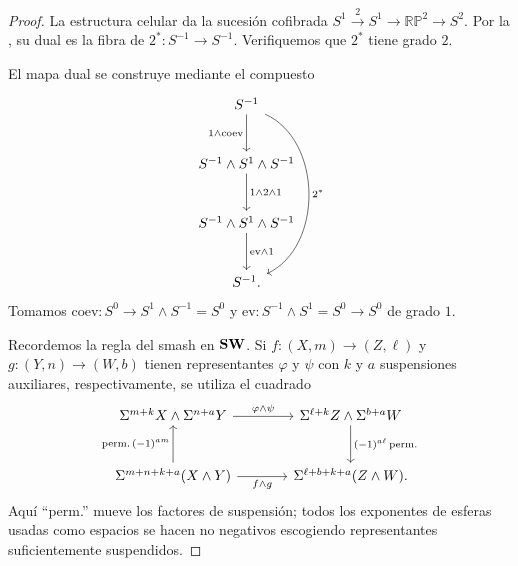 \begin{proof}
La estructura celular da la sucesión cofibrada $S^1\xrightarrow{2}S^1\to\mathbb{RP}^2\to S^2$. Por la , su dual es la fibra de $2^*\colon S^{-1}\to S^{-1}$. Verifiquemos que $2^*$ tiene grado $2$.

El mapa dual se construye mediante el compuesto
\[
\begin{tikzcd}[row sep=large]
S^{-1} \arrow[d,"1\wedge\mathrm{coev}"'] \arrow[ddd,bend left=65,"2^*"]\\
S^{-1}\wedge S^1\wedge S^{-1} \arrow[d,"1\wedge2\wedge1"]\\
S^{-1}\wedge S^1\wedge S^{-1} \arrow[d,"\mathrm{ev}\wedge1"]\\
S^{-1}.
\end{tikzcd}
\]
Tomamos $\mathrm{coev}\colon S^0\to S^1\wedge S^{-1}=S^0$ y $\mathrm{ev}\colon S^{-1}\wedge S^1=S^0\to S^0$ de grado $1$.

Recordemos la regla del smash en $\mathbf{SW}$. Si $f\colon(X,m)\to(Z,\ell)$ y $g\colon(Y,n)\to(W,b)$ tienen representantes $\varphi$ y $\psi$ con $k$ y $a$ suspensiones auxiliares, respectivamente, se utiliza el cuadrado
\[
\begin{tikzcd}[column sep=large,row sep=large]
\Sigma^{m+k}X\wedge\Sigma^{n+a}Y \arrow[r,"\varphi\wedge\psi"] & \Sigma^{\ell+k}Z\wedge\Sigma^{b+a}W \arrow[d,"(-1)^{a\ell}\,\mathrm{perm.}"]\\
\Sigma^{m+n+k+a}(X\wedge Y) \arrow[u,"\mathrm{perm.}\,(-1)^{am}"] \arrow[r,"f\wedge g"'] & \Sigma^{\ell+b+k+a}(Z\wedge W).
\end{tikzcd}
\]
Aquí ``perm.'' mueve los factores de suspensión; todos los exponentes de esferas usadas como espacios se hacen no negativos escogiendo representantes suficientemente suspendidos.


\end{proof}
